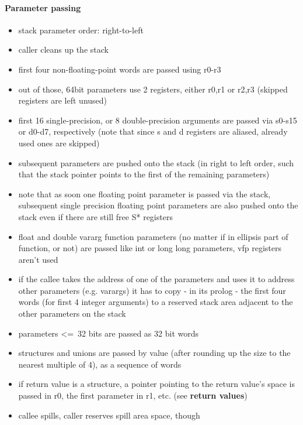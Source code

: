 \paragraph{Parameter passing}

\begin{itemize}
\item stack parameter order: right-to-left
\item caller cleans up the stack
\item first four non-floating-point words are passed using r0-r3
\item out of those, 64bit parameters use 2 registers, either r0,r1 or r2,r3 (skipped registers are left unused)
\item first 16 single-precision, or 8 double-precision arguments are passed via s0-s15 or d0-d7, respectively (note that since s and d registers are aliased, already used ones are skipped)
\item subsequent parameters are pushed onto the stack (in right to left order, such that the stack pointer points to the first of the remaining parameters)
\item note that as soon one floating point parameter is passed via the stack, subsequent single precision floating point parameters are also pushed onto the stack even if there are still free S* registers
\item float and double vararg function parameters (no matter if in ellipsis part of function, or not) are passed like int or long long parameters, vfp registers aren't used
\item if the callee takes the address of one of the parameters and uses it to address other parameters (e.g. varargs) it has to copy - in its prolog - the first four words (for first 4 integer arguments) to a reserved stack area adjacent to the other parameters on the stack
\item parameters \textless=\ 32 bits are passed as 32 bit words
\item structures and unions are passed by value (after rounding up the size to the nearest multiple of 4), as a sequence of words
\item if return value is a structure, a pointer pointing to the return value's space is passed in r0, the first parameter in r1, etc. (see {\bf return values})
\item callee spills, caller reserves spill area space, though
\end{itemize}

